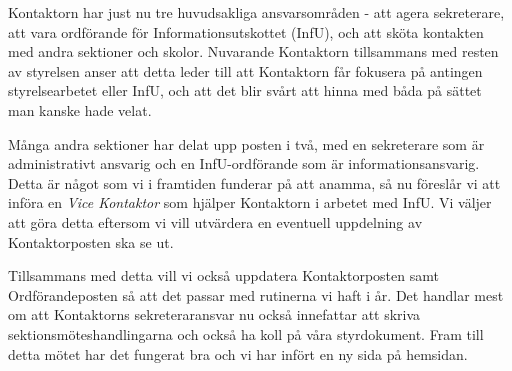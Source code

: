 \documentclass[../_main/handlingar.tex]{subfiles}
\begin{document}
Kontaktorn har just nu tre huvudsakliga ansvarsområden - att agera sekreterare, att vara ordförande för Informationsutskottet (InfU), och att sköta kontakten med andra sektioner och skolor. Nuvarande Kontaktorn tillsammans med resten av styrelsen anser att detta leder till att Kontaktorn får fokusera på antingen styrelsearbetet eller InfU, och att det blir svårt att hinna med båda på sättet man kanske hade velat.

Många andra sektioner har delat upp posten i två, med en sekreterare som är administrativt ansvarig och en InfU-ordförande som är informationsansvarig. Detta är något som vi i framtiden funderar på att anamma, så nu föreslår vi att införa en \emph{Vice Kontaktor} som hjälper Kontaktorn i arbetet med InfU. Vi väljer att göra detta eftersom vi vill utvärdera en eventuell uppdelning av Kontaktorposten ska se ut.

Tillsammans med detta vill vi också uppdatera Kontaktorposten samt Ordförandeposten så att det passar med rutinerna vi haft i år. Det handlar mest om att Kontaktorns sekreteraransvar nu också innefattar att skriva sektionsmöteshandlingarna och också ha koll på våra styrdokument. Fram till detta mötet har det fungerat bra och vi har infört en ny sida på hemsidan.
\end{document}
